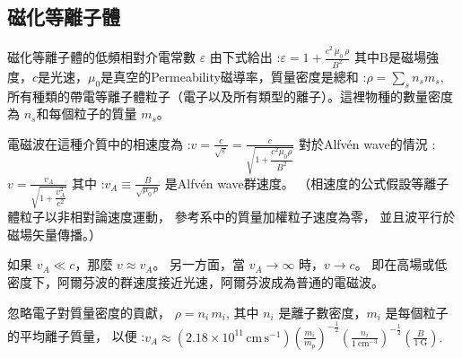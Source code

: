 \documentclass[12pt, a4paper, oneside]{article}
\begin{document}
\begin{spacing}{2.0}
\section{磁化等離子體}
磁化等離子體的低頻相對介電常數 $\varepsilon$ 由下式給出
:$\displaystyle \varepsilon = 1 + \frac{c^2\,\mu_0\,\rho}{B^2}$
其中B是磁場強度，$c$是光速，$\mu_0$是真空的Permeability磁導率，質量密度是總和
:$ \displaystyle\rho = \sum_s n_s m_s ,$
所有種類的帶電等離子體粒子（電子以及所有類型的離子）。這裡物種的數量密度為 $n_s$和每個粒子的質量 $m_s$。

電磁波在這種介質中的相速度為
:$\displaystyle v = \frac{c}{\sqrt{\varepsilon}} = \frac{c}{\sqrt{1 + \dfrac{c^2 \mu_0 \rho}{B^2}}}$
對於Alfvén wave的情況
:$\displaystyle v = \frac{v_A}{\sqrt{1 + \dfrac{v_A^2}{c^2}}}$
其中
:$\displaystyle v_A \equiv \frac{B}{\sqrt{\mu_0\,\rho}}$
是Alfvén wave群速度。
（相速度的公式假設等離子體粒子以非相對論速度運動，
參考系中的質量加權粒子速度為零，
並且波平行於磁場矢量傳播。）

如果 $\displaystyle v_A \ll c$，那麼 $v \approx v_A$。
另一方面，當 $\displaystyle v_A \to \infty$ 時，$v \to c$。 即在高場或低密度下，阿爾芬波的群速度接近光速，阿爾芬波成為普通的電磁波。

忽略電子對質量密度的貢獻，
$\rho = n_i\,m_i$,
其中 $n_i$ 是離子數密度，$m_i$ 是每個粒子的平均離子質量，
以便
:$\displaystyle v_A \approx \left(2.18 \times 10^{11}\,\text{cm}\,\text{s}^{-1}\right) \left(\frac{m_i}{m_p}\right)^{-\frac{1}{2}} \left(\frac{n_i}{1~\text{cm}^{-3}}\right)^{-\frac{1}{2} } \left(\frac{B}{1~\text{G}}\right).$













\end{spacing}{}


\end{document}
